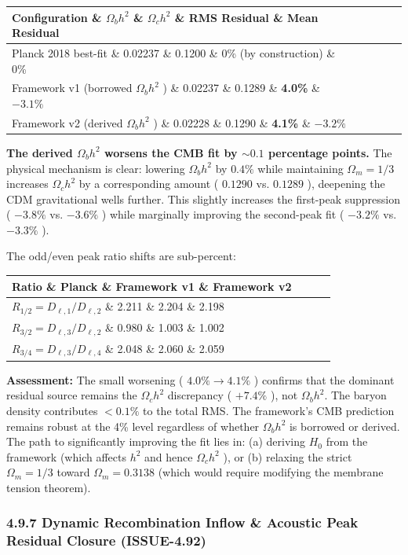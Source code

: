 \documentclass[11pt,a4paper]{article}
\theoremstyle{definition}\newtheorem{definition}{Definition}
\theoremstyle{remark}\newtheorem{remark}{Remark}
\begin{document}
\begin{longtable}{lllll}
\hline
Configuration \& $\Omega_b h^2$ \& $\Omega_c h^2$ \& RMS Residual \& Mean Residual \\
\hline
Planck 2018 best-fit \& 0.02237 \& 0.1200 \& 0\% (by construction) \& 0\% \\
Framework v1 (borrowed $\Omega_b h^2$ ) \& 0.02237 \& 0.1289 \& \textbf{4.0\%} \& $-3.1\%$ \\
Framework v2 (derived $\Omega_b h^2$ ) \& 0.02228 \& 0.1290 \& \textbf{4.1\%} \& $-3.2\%$ \\
\hline
\end{longtable}
\textbf{The derived $\Omega_b h^2$ worsens the CMB fit by $\sim 0.1$ percentage points.} The physical mechanism is clear: lowering $\Omega_b h^2$ by $0.4\%$ while maintaining $\Omega_m = 1/3$ increases $\Omega_c h^2$ by a corresponding amount ( $0.1290$ vs. $0.1289$ ), deepening the CDM gravitational wells further. This slightly increases the first-peak suppression ( $-3.8\%$ vs. $-3.6\%$ ) while marginally improving the second-peak fit ( $-3.2\%$ vs. $-3.3\%$ ).

The odd/even peak ratio shifts are sub-percent:

\begin{longtable}{llll}
\hline
Ratio \& Planck \& Framework v1 \& Framework v2 \\
\hline
$R_{1/2} = D_{\ell,1}/D_{\ell,2}$ \& 2.211 \& 2.204 \& 2.198 \\
$R_{3/2} = D_{\ell,3}/D_{\ell,2}$ \& 0.980 \& 1.003 \& 1.002 \\
$R_{3/4} = D_{\ell,3}/D_{\ell,4}$ \& 2.048 \& 2.060 \& 2.059 \\
\hline
\end{longtable}
\textbf{Assessment:} The small worsening ( $4.0\% \to 4.1\%$ ) confirms that the dominant residual source remains the $\Omega_c h^2$ discrepancy ( $+7.4\%$ ), not $\Omega_b h^2$. The baryon density contributes $< 0.1\%$ to the total RMS. The framework's CMB prediction remains robust at the 4\% level regardless of whether $\Omega_b h^2$ is borrowed or derived. The path to significantly improving the fit lies in: (a) deriving $H_0$ from the framework (which affects $h^2$ and hence $\Omega_c h^2$ ), or (b) relaxing the strict $\Omega_m = 1/3$ toward $\Omega_m = 0.3138$ (which would require modifying the membrane tension theorem).
\subsubsection{4.9.7 Dynamic Recombination Inflow \& Acoustic Peak Residual Closure (ISSUE-4.92)}
\end{document}
